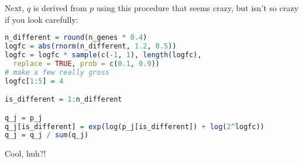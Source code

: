 Next, $q$ is derived from $p$ using this procedure that seems crazy, but isn't so crazy if you look carefully:

\begin{lstlisting}[language=R]
n_different = round(n_genes * 0.4)
logfc = abs(rnorm(n_different, 1.2, 0.5))
logfc = logfc * sample(c(-1, 1), length(logfc),
  replace = TRUE, prob = c(0.1, 0.9))
# make a few really gross
logfc[1:5] = 4

is_different = 1:n_different

q_j = p_j
q_j[is_different] = exp(log(p_j[is_different]) + log(2^logfc))
q_j = q_j / sum(q_j)
\end{lstlisting}

Cool, huh?!


